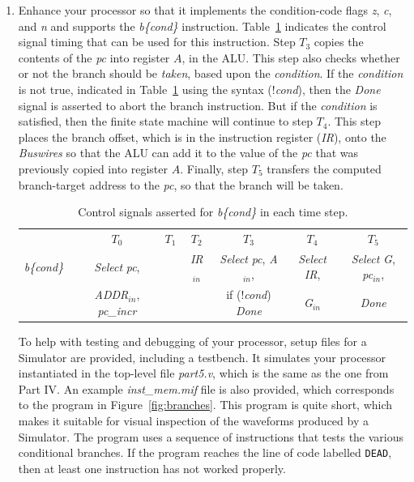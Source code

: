 \documentclass[epsfig,10pt,fullpage]{article} \addtolength{\textwidth}{1.5in}
\begin{document}
\begin{enumerate}
\item 
Enhance your processor so that it implements the condition-code flags {\it z}, {\it c}, and
{\it n} and supports the {\it b\{cond\}} instruction. Table~\ref{tab:control_b} indicates the 
control signal timing that can be used for this instruction. Step $T_3$ copies the
contents of the {\it pc} into register $A$, in the ALU. This step also checks whether or 
not the branch should be {\it taken}, based upon the {\it condition}. If the 
{\it condition} is not true, indicated in Table~\ref{tab:control_b} using the syntax 
(!{\it cond}), then the {\it Done} signal is asserted to abort the branch instruction. But if
the {\it condition} is satisfied, then the finite state machine will continue to step $T_4$.
This step places the branch offset, which is in the instruction register ({\it IR}), 
onto the {\it Buswires} so that the ALU can add it to the value of the {\it pc} that was
previously copied into register $A$. Finally, step $T_5$ transfers the computed branch-target 
address to the {\it pc}, so that the branch will be taken. 

\begin{table}[H]
\begin{center}
\begin{tabular}{r|c|c|c|c|c|c|}
\multicolumn{1}{c}{~} & \multicolumn{1}{c}{$T_0$} & \multicolumn{1}{c}{$T_1$} & \multicolumn{1}{c}{$T_2$} & \multicolumn{1}{c}{$T_3$} & \multicolumn{1}{c}{$T_4$} & \multicolumn{1}{c}{$T_5$} \rule[-0.075in]{0in}{0.25in}\\ \cline{2-7}
{\it b\{cond\}~} & {\it Select} {\it pc}, & ~ & {\it IR}$_{in}$ &
\rule[-0.075in]{0in}{0.25in}{\it Select} {\it pc}, {\it A}$_{in}$, & {\it Select} {\it
IR},
& {\it Select} {\it G}, {\it pc}$_{in}$, \\
~ & {\it ADDR}$_{in}$, {\it pc\_incr} & ~ & ~ & if (!{\it cond}) {\it Done} & {\it G}$_{in}$ & {\it Done} \\ \cline{2-7}
\cline{2-7}
\end{tabular}
\caption{Control signals asserted for {\it b\{cond\}} in each time step.}
\label{tab:control_b}
\end{center}
\end{table}

To help with testing and debugging of your processor, setup files for a Simulator are
provided, including a testbench. It simulates your processor instantiated in the top-level file
{\it part5.v}, which is the same as the one from Part IV. 
An example {\it inst\_mem.mif} file is also provided, which corresponds 
to the program in Figure~\ref{fig:branches}. This program is quite short, 
which makes it suitable for visual inspection of the waveforms produced by a Simulator. 
The program uses a sequence of instructions that tests the various conditional branches. 
If the program reaches the line of code labelled \texttt{DEAD}, then at least one 
instruction has not worked properly. 


\end{enumerate}
\end{document}
